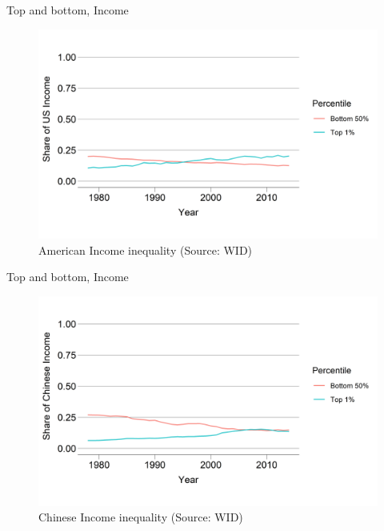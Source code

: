 \documentclass{beamer}
\begin{document}
\begin{frame}{Top and bottom, Income} 
\begin{figure}
    \centering
    \includegraphics[width=\textwidth]{../img/InequalityIncUS.png}
    \caption{American Income inequality (Source: WID)}
\end{figure}
\end{frame}{}

\begin{frame}{Top and bottom, Income} 
\begin{figure}
    \centering
    \includegraphics[width=\textwidth]{../img/InequalityIncCN.png}
    \caption{Chinese Income inequality (Source: WID)}
\end{figure}
\end{frame}{}
\end{document}

